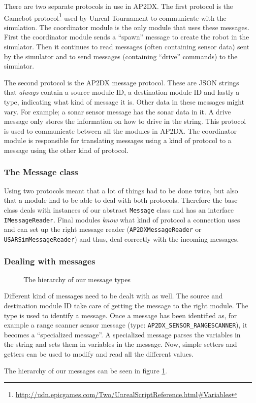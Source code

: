 There are two separate protocols in use in AP2DX. The first protocol is the
Gamebot
protocol\footnote{\url{http://udn.epicgames.com/Two/UnrealScriptReference.html\#Variables}} 
used by Unreal Tournament to communicate with the simulation. The coordinator module is the 
only module that uses these messages. First the coordinator module sends a ``spawn'' message 
to create the robot in the simulator. Then it continues to read messages (often containing 
sensor data) sent by the simulator and to send messages (containing ``drive'' commands) to
the simulator. 

The second protocol is the AP2DX message protocol. These are JSON strings that \emph{always}
contain a source module ID, a destination module ID and lastly a type, indicating what kind
of message it is. Other data in these messages might vary. For example; a sonar sensor
message has the sonar data in it. A drive message only stores the information on how to drive
in the string. 
This protocol is used to communicate between all the modules in 
AP2DX.  The coordinator module is responsible for translating messages using a kind of
protocol to a message using the other kind of protocol.

\subsubsection{The Message class}
Using two protocols meant that a lot of things had to be done twice, but also that a module 
had to be able to deal with both protocols. Therefore the 
base class deals with instances
of our abstract \texttt{Message} class and has an interface \texttt{IMessageReader}. Final modules \emph{know}
what kind of protocol a connection uses and can set up the right message reader 
(\texttt{AP2DXMessageReader}
or \texttt{USARSimMessageReader}) and thus, deal correctly with the incoming messages. 

\subsubsection{Dealing with messages}
\begin{figure}
\centerline{
}
\caption{The hierarchy of our message types}
\label{fig:messageHierarchy}
\end{figure}
Different kind of messages need to be dealt with as well. The source and destination module ID take care
of getting the message to the right module. The type is used to identify a message. Once a message
has been identified as, for example a range scanner sensor message (type:
\texttt{AP2DX\_SENSOR\_RANGESCANNER}), 
it becomes a ``specialized message''. 
A specialized message parses the variables in the string and sets them in variables in the message. Now,
simple setters and getters can be used to modify and read all the different
values.

The hierarchy of our messages can be seen in figure \ref{fig:messageHierarchy}. 



